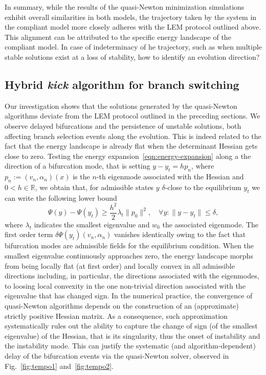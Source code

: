 In summary, while the results of the quasi-Newton minimization simulations exhibit overall similarities in both models, the trajectory taken by the system in the compliant model more closely adheres with the LEM protocol outlined above. This alignment can be attributed to the specific energy landscape of the compliant model. In case of indeterminacy of he trajectory, such as when multiple stable solutions exist at a loss of stability, how to identify an evolution direction?


\subsection{Hybrid \emph{kick} algorithm  for branch switching}
Our investigation shows that the solutions generated by the quasi-Newton algorithms deviate from the LEM protocol outlined in the preceding sections. We observe delayed bifurcations and the persistence of unstable solutions, {both affecting} branch selection events along the evolution.  This is indeed related to the fact that the energy landscape is already flat when the determinant Hessian gets close to zero.
Testing the energy expansion~\eqref{eqn:energy-expansion}
along a the direction of a bifurcation mode, that is setting $y-y_t=h p_n$, where $p_n:=(v_n, \alpha_n)(x)$ is the $n$-th eigenmode associated with  the Hessian and $0<h\in \mathbb R$, we obtain that, for admissible states $y$ $\delta$-close to the equilibrium $y_t$ we can write the following lower bound
$$
    \Psi(y)-\Psi(y_t)\geq \frac{h^2}{2}\lambda_t \|p_0\|^2, \quad \forall y: \|y - y_t\| \leq \delta,
$$
where $\lambda_t$ indicates the smallest eigenvalue and $w_0$ the associated eigenmode. The first order term $\delta\Psi(y_t)(v_n, \alpha_n)$ vanishes identically owing to the fact that bifurcation modes are admissible fields for the equilibrium condition.
When the smallest eigenvalue continuously approaches zero, the energy landscape morphs from being locally flat (at first order) and locally convex in all admissible directions including, in particular, the directions associated with  the eigenmodes, to loosing local convexity in the one non-trivial direction associated with  the eigenvalue that has changed sign.
In the numerical practice,
the convergence of quasi-Newton algorithms depends on the construction of an (approximate) strictly positive Hessian matrix.
As a consequence, such approximation systematically rules out the ability to capture the change of sign (of the smallest eigenvalue) of the Hessian, that is its singularity, thus the onset of instability and the instability mode.
This can justify the systematic (and algorithm-dependent) delay of the bifurcation events via the quasi-Newton solver, observed in Fig.~\ref{fig:tempo1} and~\ref{fig:tempo2}.

